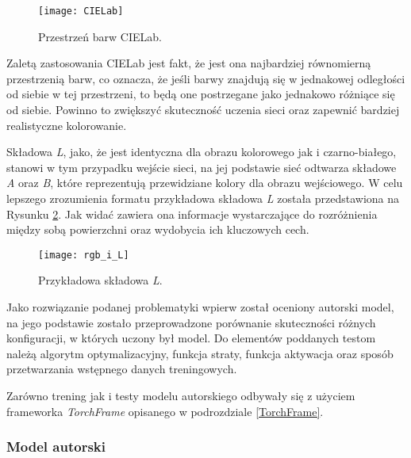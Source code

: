   \begin{figure}
    \centering
    \captionsetup{justification=centering}
    \texttt{[image: CIELab]}
    \caption[Przestrzeń barw CIELab - źródło:
    \url{https://www.flickr.com/photos/greenmambagreenmamba/4236391637}]
    {Przestrzeń barw CIELab.}
    \label{fig:CIELab}
  \end{figure}

  Zaletą zastosowania CIELab jest fakt, że jest ona najbardziej równomierną
  przestrzenią barw, co oznacza, że jeśli barwy znajdują się w jednakowej
  odległości od siebie w tej przestrzeni, to będą one postrzegane jako jednakowo
  różniące się od siebie. Powinno to zwiększyć skuteczność uczenia sieci oraz
  zapewnić bardziej realistyczne kolorowanie.

  Składowa \textit{L}, jako, że jest identyczna dla obrazu kolorowego jak i
  czarno-białego, stanowi w tym przypadku wejście sieci, na jej podstawie sieć
  odtwarza składowe \textit{A} oraz \textit{B}, które reprezentują przewidziane
  kolory dla obrazu wejściowego. W celu lepszego zrozumienia formatu przykładowa
  składowa \textit{L} została przedstawiona na Rysunku \ref{fig:przyklad_L}.
  Jak widać zawiera ona informacje wystarczające do rozróżnienia między sobą
  powierzchni oraz wydobycia ich kluczowych cech.

  \begin{figure}[ht]
    \centering
    \captionsetup{justification=centering}
    \texttt{[image: rgb\_i\_L]}
    \caption[Przykładowa składowa \textit{L} - źródło: Rysunek własny
    wykorzystujący:
    \url{https://fr.m.wikipedia.org/wiki/Fichier:An_F-A-18C_Hornet_launches_from_the_flight_deck_of_the_conventionally_powered_aircraft_carrier.jpg}]
    {Przykładowa składowa \textit{L}.}
    \label{fig:przyklad_L}
  \end{figure}

  Jako rozwiązanie podanej problematyki wpierw został oceniony autorski
  model, na jego podstawie zostało przeprowadzone porównanie skuteczności
  różnych konfiguracji, w których uczony był model. Do elementów poddanych
  testom należą algorytm optymalizacyjny, funkcja straty, funkcja aktywacja oraz
  sposób przetwarzania wstępnego danych treningowych.

  Zarówno trening jak i testy modelu autorskiego odbywały się
  z użyciem frameworka \textit{TorchFrame} opisanego w
  podrozdziale \ref{TorchFrame}.

\subsubsection{Model autorski} \label{model autorski}

